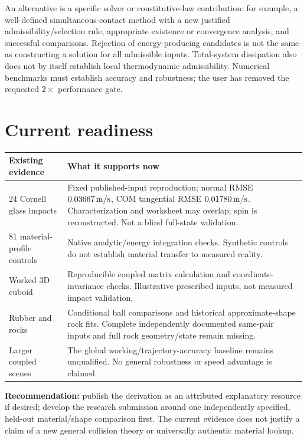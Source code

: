 \documentclass[11pt,a4paper]{article}
\begin{document}
An alternative is a specific solver or constitutive-law contribution: for example, a well-defined simultaneous-contact method with a new justified admissibility/selection rule, appropriate existence or convergence analysis, and successful comparisons. Rejection of energy-producing candidates is not the same as constructing a solution for all admissible inputs. Total-system dissipation also does not by itself establish local thermodynamic admissibility. Numerical benchmarks must establish accuracy and robustness; the user has removed the requested $2\times$ performance gate.

\section{Current readiness}
\begin{center}\small
\begin{tabular}{p{43mm}p{104mm}}
\hline
Existing evidence & What it supports now\\
\hline
24 Cornell glass impacts & Fixed published-input reproduction; normal RMSE $0.03667\,{\rm m/s}$, COM tangential RMSE $0.01780\,{\rm m/s}$. Characterization and worksheet may overlap; spin is reconstructed. Not a blind full-state validation.\\[3pt]
81 material-profile controls & Native analytic/energy integration checks. Synthetic controls do not establish material transfer to measured reality.\\[3pt]
Worked 3D cuboid & Reproducible coupled matrix calculation and coordinate-invariance checks. Illustrative prescribed inputs, not measured impact validation.\\[3pt]
Rubber and rocks & Conditional ball comparisons and historical approximate-shape rock fits. Complete independently documented same-pair inputs and full rock geometry/state remain missing.\\[3pt]
Larger coupled scenes & The global working/trajectory-accuracy baseline remains unqualified. No general robustness or speed advantage is claimed.\\
\hline
\end{tabular}\end{center}
\textbf{Recommendation:} publish the derivation as an attributed explanatory resource if desired; develop the research submission around one independently specified, held-out material/shape comparison first. The current evidence does not justify a claim of a new general collision theory or universally authentic material lookup.
\end{document}
